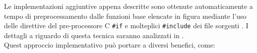 Le implementazioni aggiuntive appena descritte sono ottenute automaticamente 
a tempo di preprocessamento dalle funzioni base elencate in figura 
mediante l'uso delle direttive del pre-processore C \verb|#if| e molteplici \verb|#include| dei file sorgenti .
I dettagli a riguardo di questa tecnica saranno analizzati in .\\
\label{chSpMMSymb:funcsMultiImpleVSmanualMultiFunc}
Quest approccio implementativo può portare a diversi benefici, come:
